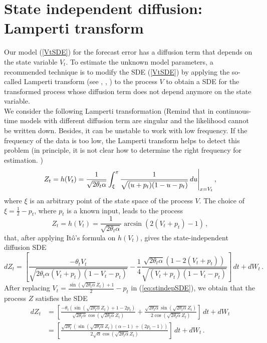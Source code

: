 \documentclass[11pt]{article}
\theoremstyle{definition}
\begin{document}
\section{State independent diffusion: Lamperti transform} \label{Section_3}

Our model (\ref{VtSDE}) for the forecast error has a diffusion term that depends on the state variable $V_t$. To estimate the unknown model parameters, a recommended technique is to modify the SDE (\ref{VtSDE}) by applying the so-called Lamperti transform (see \cite[40--41]{iacus1}, \cite{moma}, \cite[98--100]{saso}) to the process $V$ to obtain a SDE for the transformed process whose diffusion term does not depend anymore on the state variable. \\

We consider the following Lamperti transformation  {\color{red} (Remind that in continuous-time models with different diffusion term are singular and the likelihood cannot be written down. Besides, it can be unstable to work with low frequency. If the frequency of the data is too low, the Lamperti transform helps to detect this problem (in principle, it is not clear how to determine the right frequency for estimation. )}
\begin{equation}
Z_t = h(V_t) = \frac{1}{\sqrt{2 \theta_t \alpha}} \int_{\xi}^{x} \frac{1}{\sqrt{(u + p_t)(1 - u - p_t)}} \,du \Bigg{\vert}_{x = V_t} \,,
\end{equation}
where $\xi$ is an arbitrary point of the state space of the process $V$. The choice of $\xi = \frac{1}{2} - p_t$, where $p_t$ is a known input, leads to the process 
\begin{equation}
Z_t = h(V_t) = \frac{1}{\sqrt{2 \theta_t \alpha}} \arcsin (2(V_t + p_t) -1)\,,
\end{equation}
that, after applying It\^{o}'s formula on $h(V_t)$, gives the state-independent diffusion SDE
\begin{equation}
dZ_t = \left[  \frac{- \theta_t V_t}{ \sqrt{2 \theta_t \alpha (V_t + p_t)(1 - V_t - p_t)}} - \frac{1}{4} \frac{\sqrt{2 \theta_t \alpha} \left( 1 - 2 (V_t + p_t)\right)}{\sqrt{(V_t + p_t)(1 - V_t - p_t)}}  \right] \,dt + dW_t \,. \label{eq:stindepSDE}
\end{equation}
After replacing $V_t = \frac{\sin(\sqrt{2 \theta_t \alpha} Z_t) + 1}{2} - p_t$ in (\ref{eq:stindepSDE}), we obtain that the  process $Z$ satisfies the SDE
\begin{align}
dZ_t & = \left[ \frac{- \theta_t (\sin(\sqrt{2 \theta_t \alpha} Z_t) + 1 - 2 p_t)}{\sqrt{2 \theta_t \alpha} \cos{(\sqrt{2 \theta_t \alpha} Z_t)}} + \frac{\sqrt{2 \theta_t \alpha} \sin{(\sqrt{2 \theta_t \alpha} Z_t)}}{2 \cos{(\sqrt{2 \theta_t \alpha} Z_t)}} \right] \,dt + dW_t \nonumber \\
&  = \left[  \frac{\sqrt{2 \theta_t} \left( \sin(\sqrt{2 \theta_t \alpha} Z_t) (\alpha - 1) + (2 p_t -1 ) \right)}{2 \sqrt{\alpha} \cos{(\sqrt{2 \theta_t \alpha} Z_t)}}  \right] \,dt + dW_t \,. 
\end{align}
\end{document}
